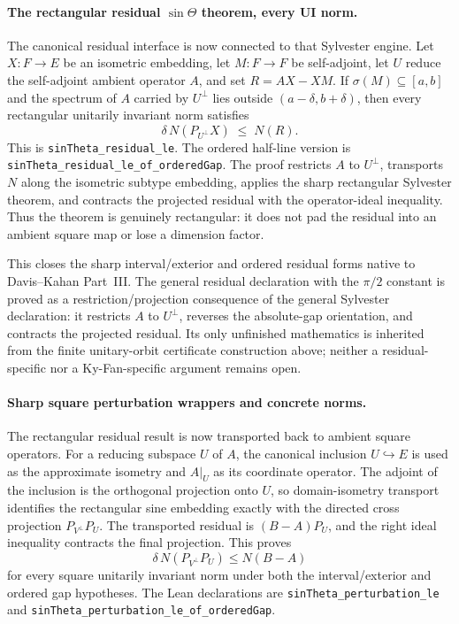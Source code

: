 \documentclass[11pt]{article}
\theoremstyle{remark}
\begin{document}
\paragraph{The rectangular residual $\sin\Theta$ theorem, every UI norm.}
The canonical residual interface is now connected to that Sylvester engine.
Let $X:F\to E$ be an isometric embedding, let $M:F\to F$ be self-adjoint,
let $U$ reduce the self-adjoint ambient operator $A$, and set
$R=AX-XM$.  If $\sigma(M)\subseteq[a,b]$ and the spectrum of $A$ carried by
$U^{\perp}$ lies outside $(a-\delta,b+\delta)$, then every rectangular
unitarily invariant norm satisfies
\[
  \delta\,N(P_{U^{\perp}}X) \;\le\; N(R).
\]
This is \texttt{sinTheta\_residual\_le}.  The ordered half-line version is
\texttt{sinTheta\_residual\_le\_of\_orderedGap}.  The proof restricts $A$ to
$U^{\perp}$, transports $N$ along the isometric subtype embedding, applies
the sharp rectangular Sylvester theorem, and contracts the projected residual
with the operator-ideal inequality.  Thus the theorem is genuinely
rectangular: it does not pad the residual into an ambient square map or lose a
dimension factor.

This closes the sharp interval/exterior and ordered residual forms native to
Davis--Kahan Part~III.  The general residual declaration with the $\pi/2$
constant is proved as a restriction/projection consequence of the general
Sylvester declaration: it restricts $A$ to $U^{\perp}$, reverses the
absolute-gap orientation, and contracts the projected residual.  Its only
unfinished mathematics is inherited from the finite unitary-orbit certificate
construction above; neither a residual-specific nor a Ky-Fan-specific argument
remains open.

\paragraph{Sharp square perturbation wrappers and concrete norms.}
The rectangular residual result is now transported back to ambient square
operators.  For a reducing subspace $U$ of $A$, the canonical inclusion
$U\hookrightarrow E$ is used as the approximate isometry and
$A|_U$ as its coordinate operator.  The adjoint of the inclusion is the
orthogonal projection onto $U$, so domain-isometry transport identifies the
rectangular sine embedding exactly with the directed cross projection
$P_{V^\perp}P_U$.  The transported residual is
$(B-A)P_U$, and the right ideal inequality contracts the final projection.
This proves
\[
  \delta\,N(P_{V^\perp}P_U) \le N(B-A)
\]
for every square unitarily invariant norm under both the interval/exterior and
ordered gap hypotheses.  The Lean declarations are
\texttt{sinTheta\_perturbation\_le} and
\texttt{sinTheta\_perturbation\_le\_of\_orderedGap}.
\end{document}
